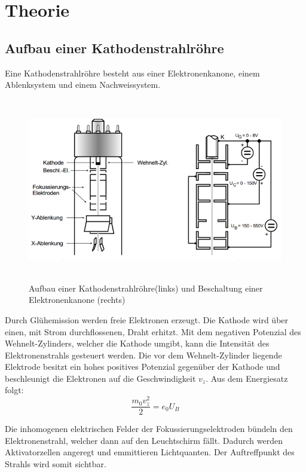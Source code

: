 \section{Theorie}
\label{sec:Theorie}



\subsection{Aufbau einer Kathodenstrahlröhre}

Eine Kathodenstrahlröhre besteht aus einer Elektronenkanone, einem Ablenksystem und einem Nachweissystem.

\begin{figure}[H]
  \centering
  \includegraphics[height=8cm]{kathodenstrahlroehre.PNG}
  \caption{Aufbau einer Kathodenstrahlröhre(links) und Beschaltung einer Elektronenkanone (rechts)}
  \label{fig:kathode}
\end{figure}

Durch Glühemission werden freie Elektronen erzeugt. Die Kathode wird über einen, mit Strom durchflossenen, Draht
erhitzt.
Mit dem negativen Potenzial des Wehnelt-Zylinders, welcher die Kathode umgibt, kann die
Intensität des Elektronenstrahls gesteuert werden.
Die vor dem Wehnelt-Zylinder liegende Elektrode besitzt ein hohes positives Potenzial gegenüber der Kathode
und beschleunigt die Elektronen auf die Geschwindigkeit $v_z$.
Aus dem Energiesatz folgt:
\begin{equation}
  \frac{m_0 v_z^2}{2} = e_0 U_B
  \label{eqn:energie}
\end{equation}

Die inhomogenen elektrischen Felder der Fokussierungselektroden bündeln den Elektronenstrahl, welcher dann
auf den Leuchtschirm fällt. Dadurch werden Aktivatorzellen angeregt und emmittieren Lichtquanten.
Der Auftreffpunkt des Strahls wird somit sichtbar.

